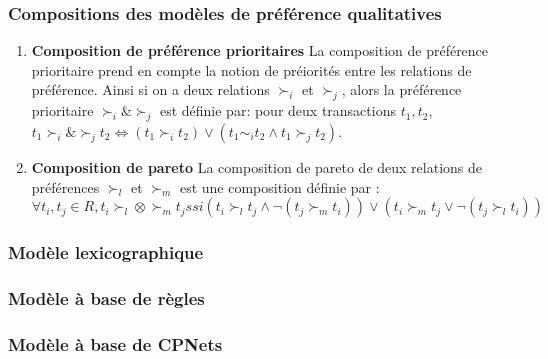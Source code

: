 \documentclass[a4paper,12pt,openany,oneside]{article}
\begin{document}
\subsubsection{Compositions des modèles de préférence qualitatives}
\begin{enumerate}

\item \textbf{Composition de préférence prioritaires}
La composition de préférence prioritaire prend en compte la notion de préiorités entre les relations de préférence. Ainsi si on a deux relations $\succ_i$ et $\succ_j$, alors la préférence prioritaire $\succ_i\&\succ_j$ est définie par: pour deux transactions $t_1,t_2$, $t_1\succ_i\&\succ_j t_2 \Leftrightarrow (t_1\succ_i t_2)\vee(t_1\sim_i t_2\wedge t_1\succ_j t_2)$.

\item \textbf{Composition de pareto}
La composition de pareto de deux relations de préférences $\succ_l$ et $\succ_m$ est une composition définie par :
\[
	\forall t_i,t_j\in R, t_i\succ_l\otimes\succ_m t_j ssi (t_i\succ_l t_j\wedge \neg (t_j\succ_m t_i))\vee(t_i\succ_m t_j\vee \neg(t_j\succ_l t_i))
\] 
\end{enumerate}





















\subsubsection{Modèle lexicographique}
\subsubsection{Modèle à base de règles}
\subsubsection{Modèle à base de CPNets}
\end{document}
